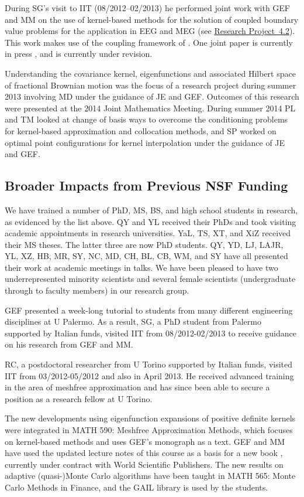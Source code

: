 \documentclass[11pt]{NSFamsart}
\newcommand{\refprobdb}{\hyperref[SectMEEG]{Research Project~4.2}\xspace}
\begin{document}
During SG's visit to IIT (08/2012--02/2013) he performed joint work with GEF and MM on the use of kernel-based methods for the solution of coupled boundary value problems for the application in EEG and MEG (see \refprobdb). This work makes use of the coupling framework of \cite{McCF14}. One joint paper is currently in press \citep{AFFGM15}, and \citep{AFFGM13} is currently under revision.

Understanding the covariance kernel, eigenfunctions and associated Hilbert space of fractional Brownian motion was the focus of a research project during summer 2013 involving MD under the guidance of JE and GEF. Outcomes of this research were presented at the 2014 Joint Mathematics Meeting. During summer 2014 PL and TM looked at change of basis ways to overcome
the conditioning problems for kernel-based approximation
and collocation methods, and SP worked on optimal point configurations for kernel
interpolation under the guidance of JE and GEF.

\subsection{Broader Impacts from Previous NSF Funding}

We have trained a number of PhD, MS, BS, and high school students in research, as evidenced by the list above.  QY and YL received their PhDs and took visiting academic appointments in research universities. YaL, TS, XT, and XiZ received their MS theses. The latter three are now PhD students.  QY, YD, LJ, LAJR, YL, XZ, HB, MR, SY, NC, MD, CH, BL, CB, WM, and SY have all presented their work at academic meetings in talks.  We have been pleased to have two underrepresented minority scientists and several female scientists (undergraduate through to faculty members) in our research group.

GEF presented a week-long tutorial to students from many different engineering disciplines at U Palermo. As a result, SG, a PhD student from Palermo supported by Italian funds, visited IIT from 08/2012-02/2013 to receive guidance on his research from GEF and MM.

RC, a postdoctoral researcher from U Torino supported by Italian funds, visited IIT from 03/2012-05/2012 and also in April 2013. He received advanced training in the area of meshfree approximation and has since been able to secure a position as a research fellow at U Torino.

The new developments using eigenfunction expansions of positive definite kernels were integrated in MATH 590: Meshfree Approximation Methods, which focuses on kernel-based methods and uses GEF's monograph \citep{Fas07a} as a text. GEF and MM have used the updated lecture notes of this course as a basis for a new book \citep{FMcC15}, currently under contract with World Scientific Publishers.  The new results on adaptive (quasi-)Monte Carlo algorithms have been taught in MATH 565: Monte Carlo Methods in Finance, and the GAIL library is used by the students.
\end{document}
